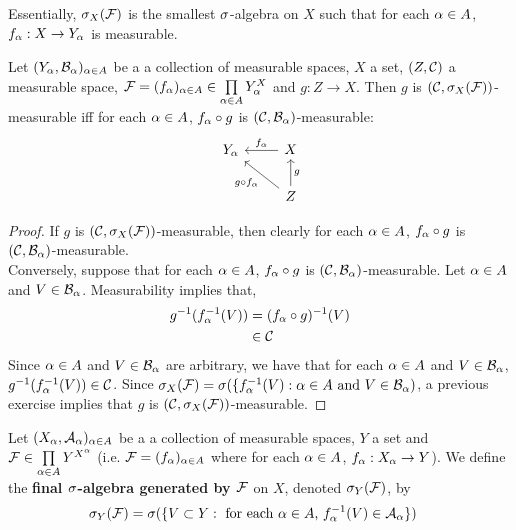\documentclass{book}
\begin{document}
	\begin{note}
		Essentially, $\sigma_X(\mathcal{F})$ is the smallest $\sigma$-algebra on $X$ such that for each $\alpha \in A$, $f_{\alpha}:X \rightarrow Y_{\alpha}$ is measurable. 
	\end{note}

	\begin{ex} 
		Let $(Y_{\alpha}, \mathcal{B}_{\alpha})_{\alpha \in A}$ be a a collection of measurable spaces, $X$ a set, $(Z, \mathcal{C})$ a measurable space, $\mathcal{F} = (f_{\alpha})_{\alpha \in A} \in \prod \limits_{\alpha \in A}Y_{\alpha}^X$ and $g: Z \rightarrow X$. Then $g$ is $(\mathcal{C}, \sigma_X(\mathcal{F}))$-measurable iff for each $\alpha \in A$, $f_{\alpha} \circ g$ is $(\mathcal{C}, \mathcal{B}_{\alpha})$-measurable:
		\[ \begin{tikzcd}
			Y_{\al}	
			& X  \arrow[l, "f_{\al}"'] \\
			& Z \arrow[ul, "g \circ f_{\al}"]  \arrow[u, "g"']
		\end{tikzcd}
		\]
	\end{ex}
	
	\begin{proof}
		If $g$ is $(\mathcal{C}, \sigma_X(\mathcal{F}))$-measurable, then clearly for each $\alpha \in A$, $ f_{\alpha} \circ g$ is $(\mathcal{C}, \mathcal{B}_{\alpha})$-measurable. \\
		Conversely, suppose that for each $\alpha \in A$, $f_{\alpha} \circ g$ is $(\mathcal{C}, \mathcal{B}_{\alpha})$-measurable. Let $\alpha \in A$ and $V \in \mathcal{B}_{\alpha}$. Measurability implies that,
		\begin{align*}
			g^{-1}(f_{\alpha}^{-1}(V)) 
			& = (f_{\alpha} \circ g)^{-1}(V) \\
			& \in \mathcal{C}
		\end{align*}
		Since $\alpha \in A$ and $V \in \mathcal{B}_{\alpha}$ are arbitrary, we have that for each $\alpha \in A$ and $V \in \mathcal{B}_{\alpha}$, $g^{-1}(f_{\alpha}^{-1}(V)) \in \mathcal{C}$. Since $\sigma_X(\mathcal{F}) = \sigma(\{f_{\alpha}^{-1}(V): \alpha \in A \text{ and } V \in \mathcal{B}_{\alpha})$, a previous exercise implies that $g$ is $(\mathcal{C}, \sigma_X(\mathcal{F}))$-measurable.
	\end{proof}
	
	\begin{defn} 
		Let $(X_{\alpha}, \mathcal{A}_{\alpha})_{\alpha \in A}$ be a a collection of measurable spaces, $Y$ a set and $\mathcal{F} \in \prod \limits_{\alpha \in A}Y^{X^{\alpha}}$ (i.e. $\mathcal{F} = (f_{\alpha})_{\alpha \in A}$ where for each $\alpha \in A$, $f_{\alpha}:X_{\alpha} \rightarrow Y$). We define the \textbf{final $\sigma$-algebra generated by $\mathcal{F}$} on $X$, denoted $\sigma_Y(\mathcal{F})$, by 
		\begin{align*}
			\sigma_Y(\mathcal{F}) 
			&= \sigma(\{V \subset Y: \text{ for each $\alpha \in A$, $f_{\alpha}^{-1}(V) \in \mathcal{A}_{\alpha}$}\})
		\end{align*}	 
	\end{defn}
	
\end{document}
